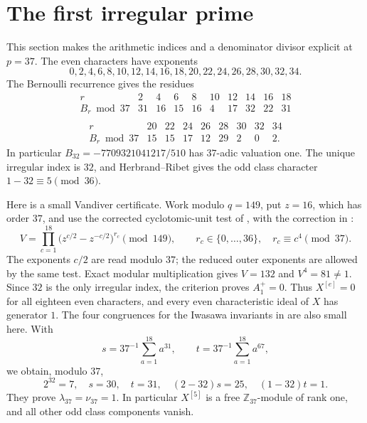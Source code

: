\documentclass[11pt]{article}
\theoremstyle{definition}\newtheorem{definition}[theorem]{Definition}
\newcommand{\Z}{\mathbb Z}\newcommand{\Q}{\mathbb Q}
\begin{document}
\section{The first irregular prime}
This section makes the arithmetic indices and a denominator divisor
explicit at $p=37$. The even characters have exponents
\[
 0,2,4,6,8,10,12,14,16,18,20,22,24,26,28,30,32,34.
\]
The Bernoulli recurrence gives the residues
\[
\begin{array}{c|rrrrrrrrr}
 r&2&4&6&8&10&12&14&16&18\\\hline
 B_r\bmod37&31&16&15&16&4&17&32&22&31\\
\end{array}
\]
\[
\begin{array}{c|rrrrrrrr}
 r&20&22&24&26&28&30&32&34\\\hline
 B_r\bmod37&15&15&17&12&29&2&0&2.
\end{array}
\]
In particular $B_{32}=-7709321041217/510$ has $37$-adic valuation one.
The unique irregular index is $32$, and Herbrand--Ribet gives the
odd class character $1-32\equiv5\pmod{36}$.

Here is a small Vandiver certificate. Work modulo $q=149$, put $z=16$,
which has order $37$, and use the corrected cyclotomic-unit test
of \cite[\S4, pp.~4--5]{BH}, with the correction in \cite[\S5]{HHO}:
\[
 V=\prod_{c=1}^{18}
      \bigl(z^{c/2}-z^{-c/2}\bigr)^{r_c}\pmod{149},
 \qquad r_c\in\{0,\ldots,36\},\quad r_c\equiv c^4\pmod{37}.
\]
The exponents $c/2$ are read modulo $37$; the reduced outer
exponents are allowed by the same test. Exact modular
multiplication gives $V=132$ and $V^4=81\ne1$.
Since $32$ is the only irregular index, the criterion proves
$A_1^+=0$. Thus $X^{[e]}=0$ for all eighteen even characters,
and every even characteristic ideal of $X$ has generator $1$.
The four congruences for the Iwasawa invariants in \cite[\S5]{HHO}
are also small here. With
\[
 s=37^{-1}\sum_{a=1}^{18}a^{31},\qquad
 t=37^{-1}\sum_{a=1}^{18}a^{67},
\]
we obtain, modulo $37$,
\[
 2^{32}=7,\quad s=30,\quad t=31,\quad
 (2-32)s=25,\quad(1-32)t=1.
\]
They prove $\lambda_{37}=\nu_{37}=1$. In particular
$X^{[5]}$ is a free $\Z_{37}$-module of rank one, and all other
odd class components vanish.
\end{document}
